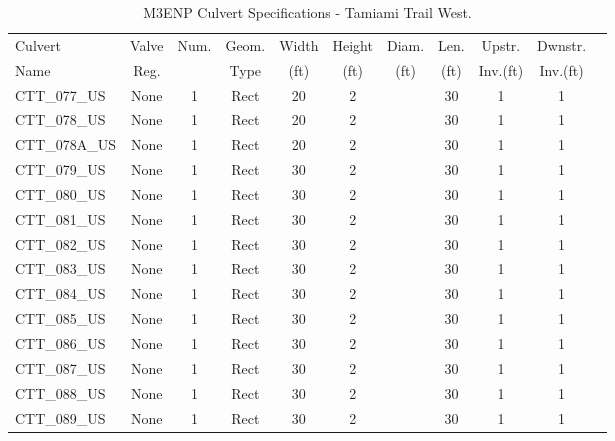 \begin{table}[]
\caption{M3ENP Culvert Specifications - Tamiami Trail West.}
\label{tab:culv-specs-CTT}
\begin{tabular}{@{}lcccccccccc@{}}
\toprule
Culvert       & Valve      & Num.     & Geom.& Width  & Height & Diam.    & Len.   & Upstr.    & Dwnstr.    \\
Name          & Reg.       &          & Type & (ft)   & (ft)   & (ft)     & (ft)   & Inv.(ft)  & Inv.(ft)   \\
\midrule
CTT\_077\_US  & None       & 1        & Rect & 20     & 2     &          & 30     & 1         & 1          \\
CTT\_078\_US  & None       & 1        & Rect & 20     & 2     &          & 30     & 1         & 1          \\
CTT\_078A\_US & None       & 1        & Rect & 20     & 2     &          & 30     & 1         & 1          \\
CTT\_079\_US  & None       & 1        & Rect & 30     & 2     &          & 30     & 1         & 1          \\
CTT\_080\_US  & None       & 1        & Rect & 30     & 2     &          & 30     & 1         & 1          \\
CTT\_081\_US  & None       & 1        & Rect & 30     & 2     &          & 30     & 1         & 1          \\
CTT\_082\_US  & None       & 1        & Rect & 30     & 2     &          & 30     & 1         & 1          \\
CTT\_083\_US  & None       & 1        & Rect & 30     & 2     &          & 30     & 1         & 1          \\
CTT\_084\_US  & None       & 1        & Rect & 30     & 2     &          & 30     & 1         & 1          \\
CTT\_085\_US  & None       & 1        & Rect & 30     & 2     &          & 30     & 1         & 1          \\
CTT\_086\_US  & None       & 1        & Rect & 30     & 2     &          & 30     & 1         & 1          \\
CTT\_087\_US  & None       & 1        & Rect & 30     & 2     &          & 30     & 1         & 1          \\
CTT\_088\_US  & None       & 1        & Rect & 30     & 2     &          & 30     & 1         & 1          \\
CTT\_089\_US  & None       & 1        & Rect & 30     & 2     &          & 30     & 1         & 1          \\

\end{tabular}
\end{table}
